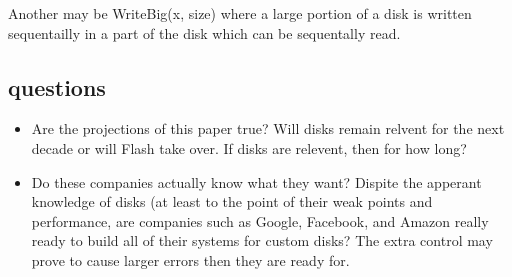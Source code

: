 Another may be WriteBig(x, size) where a large portion of a disk is written
sequentailly in a part of the disk which can be sequentally read.

\subsection{questions}

\begin{itemize}

\item Are the projections of this paper true? Will disks remain relvent for the
next decade or will Flash take over. If disks are relevent, then for how long?

\item Do these companies actually know what they want? Dispite the apperant
knowledge of disks (at least to the point of their weak points and performance,
are companies such as Google, Facebook, and Amazon really ready to build all of
their systems for custom disks? The extra control may prove to cause larger
errors then they are ready for.

\end{itemize}
